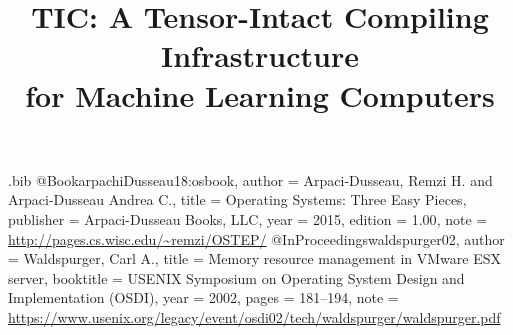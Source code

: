 \usepackage{filecontents}

\begin{filecontents}{\jobname.bib}
@Book{arpachiDusseau18:osbook,
  author =       {Arpaci-Dusseau, Remzi H. and Arpaci-Dusseau Andrea C.},
  title =        {Operating Systems: Three Easy Pieces},
  publisher =    {Arpaci-Dusseau Books, LLC},
  year =         2015,
  edition =      {1.00},
  note =         {\url{http://pages.cs.wisc.edu/~remzi/OSTEP/}}
}
@InProceedings{waldspurger02,
  author =       {Waldspurger, Carl A.},
  title =        {Memory resource management in {VMware ESX} server},
  booktitle =    {USENIX Symposium on Operating System Design and
                  Implementation (OSDI)},
  year =         2002,
  pages =        {181--194},
  note =         {\url{https://www.usenix.org/legacy/event/osdi02/tech/waldspurger/waldspurger.pdf}}}
\end{filecontents}



\date{}

\title{\Large \bf TIC: A Tensor-Intact Compiling Infrastructure \\for Machine Learning Computers}


\maketitle

